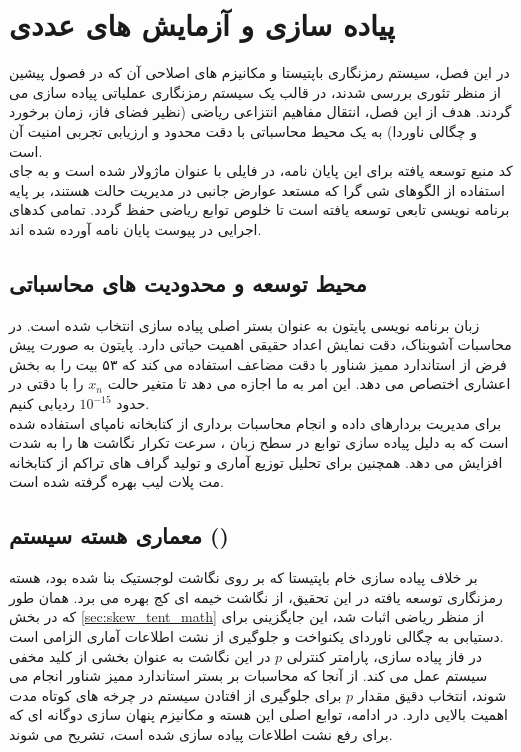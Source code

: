 \documentclass[12pt]{report}
\begin{document}
\chapter{پیاده سازی و آزمایش های عددی}

در این فصل، سیستم رمزنگاری باپتیستا و مکانیزم های اصلاحی آن که در فصول پیشین از منظر تئوری 
بررسی شدند، در قالب یک سیستم رمزنگاری عملیاتی پیاده سازی می گردند. هدف از این فصل، انتقال 
مفاهیم انتزاعی ریاضی (نظیر فضای فاز، زمان برخورد و چگالی ناوردا) به یک محیط محاسباتی با دقت 
محدود و ارزیابی تجربی امنیت آن است. 
\\\noindent
کد منبع توسعه یافته برای این پایان نامه، در فایلی با عنوان  ماژولار 
شده است و به جای استفاده از الگوهای شی گرا که مستعد عوارض جانبی 
در مدیریت حالت هستند، بر پایه برنامه نویسی تابعی 
توسعه یافته است تا خلوص توابع ریاضی حفظ گردد. تمامی کدهای اجرایی در پیوست پایان نامه 
آورده شده اند.

\section{محیط توسعه و محدودیت های محاسباتی}
زبان برنامه نویسی پایتون به عنوان بستر اصلی پیاده سازی انتخاب شده است. 
در محاسبات آشوبناک، دقت نمایش اعداد حقیقی اهمیت حیاتی دارد. پایتون به صورت پیش فرض از استاندارد 
ممیز شناور  با دقت مضاعف استفاده می کند \cite{ieee754-2008}
که ۵۳ بیت 
را به بخش اعشاری اختصاص می دهد. این امر به ما اجازه می دهد تا متغیر حالت $x_n$ را با دقتی در 
حدود $10^{-15}$ ردیابی کنیم. 
\\\noindent
برای مدیریت بردارهای داده و انجام محاسبات برداری از کتابخانه 
نامپای استفاده شده است که به دلیل پیاده سازی توابع در سطح زبان ، 
سرعت تکرار نگاشت ها را به شدت افزایش می دهد. همچنین برای تحلیل توزیع آماری و تولید گراف های 
تراکم از کتابخانه مت پلات لیب بهره گرفته شده است.

\section{معماری هسته سیستم ()}

بر خلاف پیاده سازی خام باپتیستا که بر روی نگاشت لوجستیک بنا شده بود، هسته رمزنگاری توسعه یافته 
در این تحقیق، از نگاشت خیمه ای کج بهره می برد. همان طور که 
در بخش \ref{sec:skew_tent_math} از منظر ریاضی اثبات شد، این جایگزینی برای دستیابی به چگالی 
ناوردای یکنواخت و جلوگیری از نشت اطلاعات آماری الزامی است. 
\\\noindent
در فاز پیاده سازی، پارامتر کنترلی $p$ در این نگاشت به عنوان بخشی از کلید مخفی سیستم عمل 
می کند. از آنجا که محاسبات بر بستر استاندارد ممیز شناور  انجام می شوند، انتخاب 
دقیق مقدار $p$ برای جلوگیری از افتادن سیستم در چرخه های کوتاه مدت 
اهمیت بالایی دارد. در ادامه، توابع اصلی این هسته و مکانیزم پنهان سازی دوگانه ای که برای رفع 
نشت اطلاعات پیاده سازی شده است، تشریح می شوند.
\end{document}
